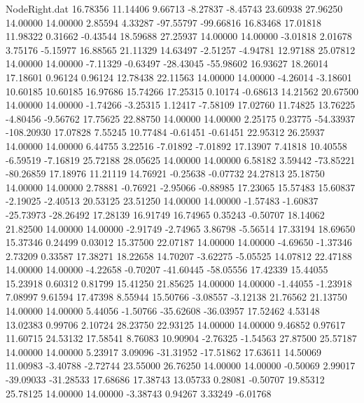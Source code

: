 \begin{filecontents}{NodeRight.dat}
  16.78356   11.14406    9.66713    -8.27837   -8.45743   23.60938   27.96250   14.00000   14.00000    2.85594    4.33287  -97.55797  -99.66816
  16.83468   17.01818   11.98322     0.31662   -0.43544   18.59688   27.25937   14.00000   14.00000   -3.01818    2.01678    3.75176   -5.15977
  16.88565   21.11329   14.63497    -2.51257   -4.94781   12.97188   25.07812   14.00000   14.00000   -7.11329   -0.63497  -28.43045  -55.98602
  16.93627   18.26014   17.18601     0.96124    0.96124   12.78438   22.11563   14.00000   14.00000   -4.26014   -3.18601   10.60185   10.60185
  16.97686   15.74266   17.25315     0.10174   -0.68613   14.21562   20.67500   14.00000   14.00000   -1.74266   -3.25315    1.12417   -7.58109
  17.02760   11.74825   13.76225    -4.80456   -9.56762   17.75625   22.88750   14.00000   14.00000    2.25175    0.23775  -54.33937 -108.20930
  17.07828    7.55245   10.77484    -0.61451   -0.61451   22.95312   26.25937   14.00000   14.00000    6.44755    3.22516   -7.01892   -7.01892
  17.13907    7.41818   10.40558    -6.59519   -7.16819   25.72188   28.05625   14.00000   14.00000    6.58182    3.59442  -73.85221  -80.26859
  17.18976   11.21119   14.76921    -0.25638   -0.07732   24.27813   25.18750   14.00000   14.00000    2.78881   -0.76921   -2.95066   -0.88985
  17.23065   15.57483   15.60837    -2.19025   -2.40513   20.53125   23.51250   14.00000   14.00000   -1.57483   -1.60837  -25.73973  -28.26492
  17.28139   16.91749   16.74965     0.35243   -0.50707   18.14062   21.82500   14.00000   14.00000   -2.91749   -2.74965    3.86798   -5.56514
  17.33194   18.69650   15.37346     0.24499    0.03012   15.37500   22.07187   14.00000   14.00000   -4.69650   -1.37346    2.73209    0.33587
  17.38271   18.22658   14.70207    -3.62275   -5.05525   14.07812   22.47188   14.00000   14.00000   -4.22658   -0.70207  -41.60445  -58.05556
  17.42339   15.44055   15.23918     0.60312    0.81799   15.41250   21.85625   14.00000   14.00000   -1.44055   -1.23918    7.08997    9.61594
  17.47398    8.55944   15.50766    -3.08557   -3.12138   21.76562   21.13750   14.00000   14.00000    5.44056   -1.50766  -35.62608  -36.03957
  17.52462    4.53148   13.02383     0.99706    2.10724   28.23750   22.93125   14.00000   14.00000    9.46852    0.97617   11.60715   24.53132
  17.58541    8.76083   10.90904    -2.76325   -1.54563   27.87500   25.57187   14.00000   14.00000    5.23917    3.09096  -31.31952  -17.51862
  17.63611   14.50069   11.00983    -3.40788   -2.72744   23.55000   26.76250   14.00000   14.00000   -0.50069    2.99017  -39.09033  -31.28533
  17.68686   17.38743   13.05733     0.28081   -0.50707   19.85312   25.78125   14.00000   14.00000   -3.38743    0.94267    3.33249   -6.01768

\end{filecontents}
